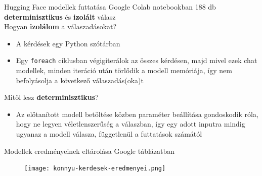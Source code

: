 \documentclass{beamer}
\begin{document}
    \begin{frame}{Hugging Face modellek futtatása Google Colab notebookban}
        188 db \textbf{determinisztikus} és \textbf{izolált} válasz\\  Hogyan \textbf{izolálom} a válaszadásokat? \\
        \begin{itemize}
            \item A kérdések egy Python szótárban\\
            \item Egy \texttt{foreach} ciklusban végigiterálok az összes kérdésen, majd mivel ezek chat modellek, minden iteráció után törlődik a modell memóriája, így nem befolyásolja a következő válaszadás(oka)t\\
        \end{itemize}
        Mitől lesz \textbf{determinisztikus}?\\
        \begin{itemize}
            \item Az előtanított modell betöltése közben paraméter beállítása gondoskodik róla, hogy ne legyen véletlenszerűség a válaszban, így egy adott inputra mindig ugyanaz a modell válasza, függetlenül a futtatások számától\\
        \end{itemize}

    \end{frame}

    \begin{frame}{Modellek eredményeinek eltárolása Google táblázatban}
        \begin{figure}
            \centering
            \texttt{[image: konnyu-kerdesek-eredmenyei.png]}
            \label{fig:enter-label}
        \end{figure}
    \end{frame}
\end{document}
